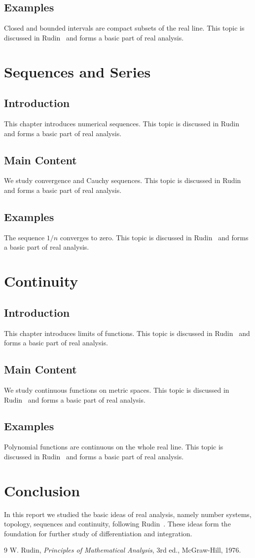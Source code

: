 \documentclass[12pt]{report}
\newcommand{\txt}[1]{#1 This topic is discussed in Rudin~\cite{R} and forms a basic part of real analysis.}
\begin{document}
	\section{Examples}
	\txt{Closed and bounded intervals are compact subsets of the real line.}
	
	\chapter{Sequences and Series}
	\section{Introduction}
	\txt{This chapter introduces numerical sequences.}
	\section{Main Content}
	\txt{We study convergence and Cauchy sequences\index{Cauchy sequence}.}
	\section{Examples}
	\txt{The sequence $1/n$ converges to zero.}
	
	\chapter{Continuity}
	\section{Introduction}
	\txt{This chapter introduces limits of functions.}
	\section{Main Content}
	\txt{We study continuous functions on metric spaces.}
	\section{Examples}
	\txt{Polynomial functions are continuous on the whole real line.}
	
	\chapter{Conclusion}
	In this report we studied the basic ideas of real analysis, namely number systems, topology, sequences and continuity, following Rudin~\cite{R}. These ideas form the foundation for further study of differentiation and integration.
	
	\begin{thebibliography}{9}
		 W. Rudin, \emph{Principles of Mathematical Analysis}, 3rd ed., McGraw-Hill, 1976.
	\end{thebibliography}
	
	\printindex
\end{document}
